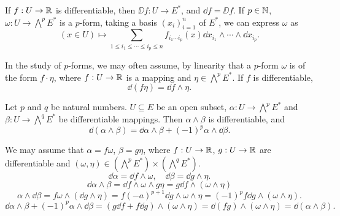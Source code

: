 \begin{exampleenv}
    If $f : U \rightarrow \mathbb{R}$ is differentiable, then $\DD f : U \rightarrow E^*$, and $\dd f = \DD f$.
    If $p \in \mathbb{N}$, $\omega : U \rightarrow \bigwedge^p E^*$ is a $p$-form,
    taking a basis $(x_i)_{i=1}^n$ of $E^*$, we can express $\omega$ as
    $$(x \in U) \longmapsto \sum_{1 \le i_1 \le \cdots \le i_p \le n} f_{i_1 \cdots i_p} (x) \dd x_{i_1} \wedge \cdots \wedge \dd x_{i_p}.$$
\end{exampleenv}

\begin{remark}
    In the study of $p$-forms, we may often assume, by linearity that a $p$-form $\omega$ is of the form $f\cdot\eta$, where $f : U \rightarrow \mathbb{R}$ is a mapping and $\eta \in \bigwedge^{p} E^*$.
    If $f$ is differentiable,
    $$\dd(f \eta) = \dd f \wedge \eta.$$
\end{remark}

\begin{propositionenv}
    Let $p$ and $q$ be natural numbers. $U \subseteq E$ be an open subset, $\alpha : U \rightarrow \bigwedge^p E^*$ and $\beta : U \rightarrow \bigwedge^q E^*$ be differentiable mappings.
    Then $\alpha \wedge \beta$ is differentiable, and
    $$\dd(\alpha \wedge \beta) = \dd \alpha \wedge \beta + (-1)^p \alpha \wedge \dd \beta.$$
\end{propositionenv}
\begin{proofenv}
    We may assume that $\alpha = f \omega$, $\beta = g \eta$, where $f: U \rightarrow \mathbb{R}$, $g: U \rightarrow \mathbb{R}$ are differentiable and $(\omega,\eta) \in (\bigwedge^p E^*)\times (\bigwedge^q E^*)$.
    $$\dd \alpha = \dd f \wedge \omega,\quad \dd \beta = \dd g \wedge \eta.$$
    $$\dd \alpha \wedge \beta = \dd f \wedge \omega \wedge g \eta = g \dd f \wedge (\omega \wedge \eta)$$
    $$\alpha \wedge \dd \beta = f \omega \wedge (\dd g \wedge \eta) = f (-a)^{p+1} \dd g \wedge \omega \wedge \eta = (-1)^p f \dd g \wedge (\omega \wedge \eta).$$
    $$\dd \alpha \wedge \beta + (-1)^p \alpha \wedge \dd \beta = (g \dd f + f \dd g)\wedge (\omega \wedge \eta) = \dd(fg)\wedge (\omega \wedge \eta) = \dd (\alpha \wedge \beta).$$
\end{proofenv}

